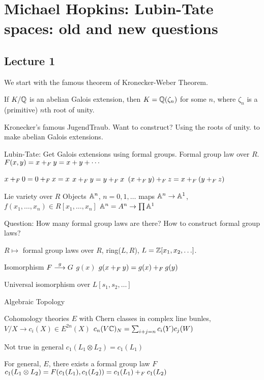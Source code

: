 \newpage
\section{Michael Hopkins: Lubin-Tate spaces: old and new questions}
\subsection{Lecture 1}

We start with the famous theorem of Kronecker-Weber Theorem.

\begin{thm}
If $K/\mathbb{Q}$ is an abelian Galois extension, then $K= \mathbb{Q}(\zeta_n)$ for some $n$, where $\zeta_n$ is a (primitive) $n$th root of unity. 
\end{thm}

Kronecker's famous JugendTraub. Want to construct? Using the roots of unity. to make abelian Galois extensions. 





Lubin-Tate: Get Galois extensions using formal groups. Formal group law over $R$. $F(x,y)= x+_F y= x + y + \cdots$

$x+_F 0 = 0+_F x= x$
$x+_F y= y +_F x$
$(x +_F y) +_F z = x +_F (y +_F z)$

Lie variety over $R$
Objects $\mathbb{A}^n$, $n= 0,1,\ldots$
maps $\mathbb{A}^n \to \mathbb{A}^1$, $f(x_1,\ldots,x_n) \in R[x_1,\ldots,x_n]$
$\mathbb{A}^n= A^n \to \prod \mathbb{A}^1$ 


Question: How many formal group laws are there? How to construct formal group laws?

\begin{thm}[Lazard]
$R \mapsto$ formal group laws over $R$, ring($L,R$), $L= \mathbb{Z}[x_1,x_2,\ldots]$.
\end{thm}

Isomorphism $F \stackrel{g}{\longrightarrow} G$
$g(x)$
$g(x +_F y)= g(x) +_F g(y)$

Universal isomorphism over $L[s_1,s_2,\ldots]$



Algebraic Topology

Cohomology theories $E$ with Chern classes in complex line bunles,
$V /X \to c_i(X) \in E^{2n}(X)$
$c_n(V\mathbb{C})_N= \sum_{i+j=n} c_i(Y) c_j(W)$

Not true in general $c_1(L_1 \otimes L_2)= c_1(L_1)$


\begin{thm}[Quillen]
For general, $E$, there exists a formal group law $F$
$c_1(L_1 \otimes L_2)= F(c_1(L_1),c_1(L_2))= c_1(L_1) +_F c_1(L_2)$
\end{thm}

